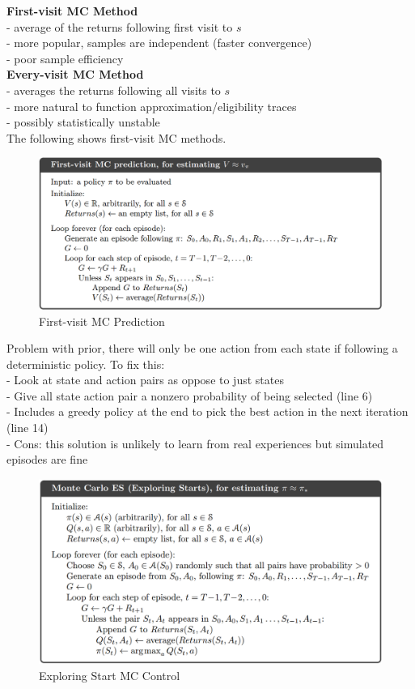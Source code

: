 \documentclass{article}
\begin{document}
\noindent
\textbf{First-visit MC Method}\\
- average of the returns following first visit to $s$\\
- more popular, samples are independent (faster convergence)\\
- poor sample efficiency\\

\noindent
\textbf{Every-visit MC Method}\\
- averages the returns following all visits to $s$\\
- more natural to function approximation/eligibility traces\\
- possibly statistically unstable\\

\noindent
The following shows first-visit MC methods.

\begin{figure}[h]
\includegraphics[scale=0.25]{firstvisit_mc}
\centering
\caption{First-visit MC Prediction}
\end{figure}

\noindent
Problem with prior, there will only be one action from each state if following
a deterministic policy. To fix this: \\
- Look at state and action pairs as oppose to just states\\
- Give all state action pair a nonzero probability of being selected (line 6)\\
- Includes a greedy policy at the end to pick the best action in the next
iteration (line 14)\\
- Cons: this solution is unlikely to learn from real experiences but simulated
episodes are fine\\

\begin{figure}[h]
\includegraphics[scale=0.25]{exploringstart_mc}
\centering
\caption{Exploring Start MC Control}
\end{figure}
\end{document}
